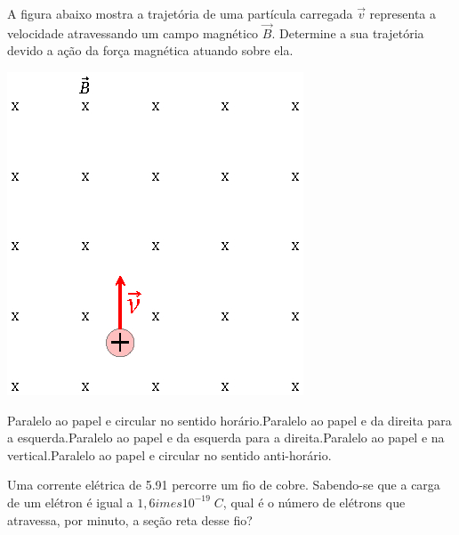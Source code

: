 \documentclass[12pt, addpoints]{exam}
\begin{document}
        \begin{questions}
\begin{multicols*}{2}
\question[20] A ﬁgura abaixo mostra a trajetória de uma partícula carregada $\vec{v}$ representa a velocidade atravessando um campo magnético $\vec{B}$. Determine a sua trajetória devido a ação da força magnética atuando sobre ela.

\begin{center}
\begin{minipage}[c]{0.75\linewidth}
\includegraphics[width=\textwidth]{CEMAG001.jpg}
\end{minipage}
\end{center}
\begin{choices}
\choice Paralelo ao papel e circular no sentido horário.\choice Paralelo ao papel e da direita para a esquerda.\choice Paralelo ao papel e da esquerda para a direita.\choice Paralelo ao papel e na vertical.\choice Paralelo ao papel e circular no sentido anti-horário.\end{choices}
\question[20] Uma corrente elétrica de    5.91 percorre um ﬁo de cobre. Sabendo-se que a carga de um elétron é igual a $1,6	imes 10^{-19}\;C$, qual é o número de elétrons que atravessa, por minuto, a seção reta desse ﬁo?

\begin{oneparchoices}
          \end{oneparchoices}
\end{multicols*}
\end{questions}
\newpage
\end{document}
